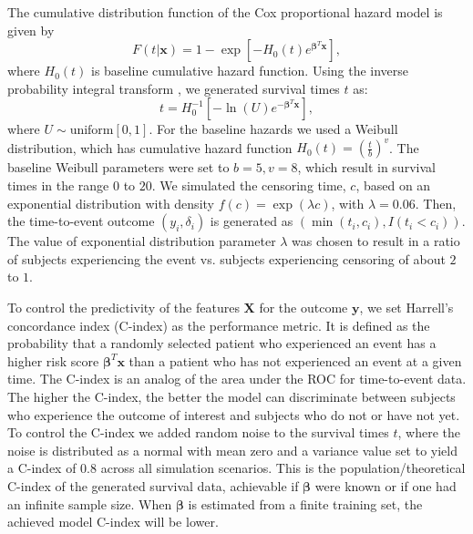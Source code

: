 The cumulative distribution function of the Cox proportional hazard model is given by
\begin{equation*}
    F(t|\bm{x})=1-\exp\left[-H_0(t)e^{\bm{\beta}^T\bm{x}}\right],
\end{equation*}
where $H_0(t)$ is baseline cumulative hazard function. Using the inverse probability integral transform \citep{bender2005generating}, we generated survival times $t$ as:
\begin{equation}
    t=H_0^{-1}\left[-\ln(U)e^{-\bm{\beta}^T\bm{x}}\right], \label{eq2.10}
\end{equation}
where $U\sim \text{uniform}[0,1]$. For the baseline hazards we used a Weibull distribution, which has cumulative hazard function $H_0(t)=(\frac{t}{b})^v$. The baseline Weibull parameters were set to $b=5,v=8$, which result in survival times in the range $0$ to $20$. We simulated the censoring time, $c$, based on an exponential distribution with density $f(c)=\exp(\lambda c)$, with $\lambda=0.06$. Then, the time-to-event outcome $(y_i,\delta_i)$ is generated as $(\min(t_i,c_i),I(t_i<c_i))$. The value of exponential distribution parameter $\lambda$ was chosen to result in a ratio of subjects experiencing the event vs. subjects experiencing censoring of about $2$ to $1$.

To control the predictivity of the features $\bm{X}$ for the outcome $\bm{y}$, we set Harrell’s concordance index (C-index) \citep{harrell1982evaluating} as the performance metric. It is defined as the probability that a randomly selected patient who experienced an event has a higher risk score $\bm{\beta}^T\bm{x}$ than a patient who has not experienced an event at a given time. The C-index is an analog of the area under the ROC for time-to-event data. The higher the C-index, the better the model can discriminate between subjects who experience the outcome of interest and subjects who do not or have not yet. To control the C-index we added random noise to the survival times $t$, where the noise is distributed as a normal with mean zero and a variance value set to yield a C-index of 0.8 across all simulation scenarios. This is the population/theoretical C-index of the generated survival data, achievable if $\bm{\beta}$ were known or if one had an infinite sample size. When $\bm{\beta}$ is estimated from a finite training set, the achieved model C-index will be lower.

